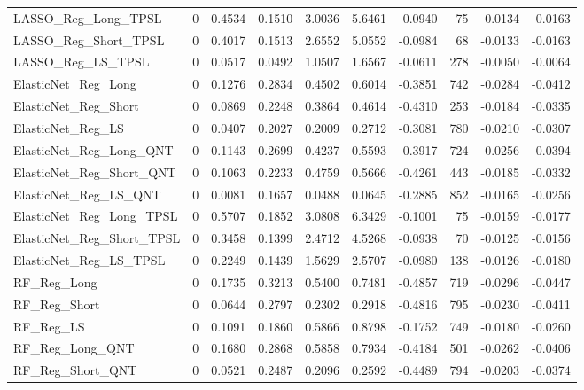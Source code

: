 \begin{tabular}{llrrrrrrrr}
\cline{1-10}
LASSO\_Reg\_Long\_TPSL & 0 & 0.4534 & 0.1510 & 3.0036 & 5.6461 & -0.0940 & 75 & -0.0134 & -0.0163 \\
\cline{1-10}
LASSO\_Reg\_Short\_TPSL & 0 & 0.4017 & 0.1513 & 2.6552 & 5.0552 & -0.0984 & 68 & -0.0133 & -0.0163 \\
\cline{1-10}
LASSO\_Reg\_LS\_TPSL & 0 & 0.0517 & 0.0492 & 1.0507 & 1.6567 & -0.0611 & 278 & -0.0050 & -0.0064 \\
\cline{1-10}
ElasticNet\_Reg\_Long & 0 & 0.1276 & 0.2834 & 0.4502 & 0.6014 & -0.3851 & 742 & -0.0284 & -0.0412 \\
\cline{1-10}
ElasticNet\_Reg\_Short & 0 & 0.0869 & 0.2248 & 0.3864 & 0.4614 & -0.4310 & 253 & -0.0184 & -0.0335 \\
\cline{1-10}
ElasticNet\_Reg\_LS & 0 & 0.0407 & 0.2027 & 0.2009 & 0.2712 & -0.3081 & 780 & -0.0210 & -0.0307 \\
\cline{1-10}
ElasticNet\_Reg\_Long\_QNT & 0 & 0.1143 & 0.2699 & 0.4237 & 0.5593 & -0.3917 & 724 & -0.0256 & -0.0394 \\
\cline{1-10}
ElasticNet\_Reg\_Short\_QNT & 0 & 0.1063 & 0.2233 & 0.4759 & 0.5666 & -0.4261 & 443 & -0.0185 & -0.0332 \\
\cline{1-10}
ElasticNet\_Reg\_LS\_QNT & 0 & 0.0081 & 0.1657 & 0.0488 & 0.0645 & -0.2885 & 852 & -0.0165 & -0.0256 \\
\cline{1-10}
ElasticNet\_Reg\_Long\_TPSL & 0 & 0.5707 & 0.1852 & 3.0808 & 6.3429 & -0.1001 & 75 & -0.0159 & -0.0177 \\
\cline{1-10}
ElasticNet\_Reg\_Short\_TPSL & 0 & 0.3458 & 0.1399 & 2.4712 & 4.5268 & -0.0938 & 70 & -0.0125 & -0.0156 \\
\cline{1-10}
ElasticNet\_Reg\_LS\_TPSL & 0 & 0.2249 & 0.1439 & 1.5629 & 2.5707 & -0.0980 & 138 & -0.0126 & -0.0180 \\
\cline{1-10}
RF\_Reg\_Long & 0 & 0.1735 & 0.3213 & 0.5400 & 0.7481 & -0.4857 & 719 & -0.0296 & -0.0447 \\
\cline{1-10}
RF\_Reg\_Short & 0 & 0.0644 & 0.2797 & 0.2302 & 0.2918 & -0.4816 & 795 & -0.0230 & -0.0411 \\
\cline{1-10}
RF\_Reg\_LS & 0 & 0.1091 & 0.1860 & 0.5866 & 0.8798 & -0.1752 & 749 & -0.0180 & -0.0260 \\
\cline{1-10}
RF\_Reg\_Long\_QNT & 0 & 0.1680 & 0.2868 & 0.5858 & 0.7934 & -0.4184 & 501 & -0.0262 & -0.0406 \\
\cline{1-10}
RF\_Reg\_Short\_QNT & 0 & 0.0521 & 0.2487 & 0.2096 & 0.2592 & -0.4489 & 794 & -0.0203 & -0.0374 \\

\end{tabular}
